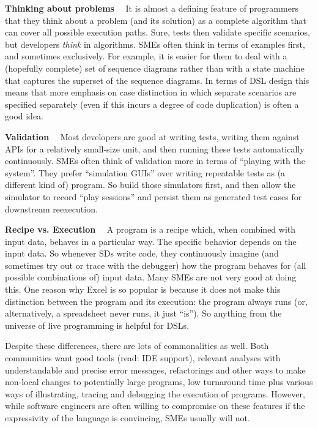 \documentclass[runningheads]{llncs}
\newcommand\parhead[1]{\vspace{1mm}\noindent\textbf{{#1}}\ \ }
\begin{document}
\parhead{Thinking about problems} It is almost a defining feature of programmers
that they think about a problem (and its solution) as a complete algorithm that
can cover all possible execution paths. Sure, tests then validate specific
scenarios, but developers \emph{think} in algorithms. SMEs often think in terms
of examples first, and sometimes exclusively. For example, it is easier for them
to deal with a (hopefully complete) set of sequence diagrams rather than with a
state machine that captures the superset of the sequence diagrams. In terms of
DSL design this means that more emphasis on case distinction in which
separate scenarios are specified separately (even if this incurs a degree of code
duplication) is often a good idea.

\parhead{Validation} Most developers are good at writing tests, writing
them against APIs for a relatively small-size unit, and then running these
tests automatically continuously. SMEs often think of validation more in
terms of ``playing with the system''. They prefer ``simulation GUIs'' over
writing repeatable tests as (a different kind of) program. So build those
simulators first, and then allow the simulator to record ``play sessions''
and persist them as generated test cases for downstream reexecution.

\parhead{Recipe vs. Execution} A program is a recipe which, when combined with
input data, behaves in a particular way. The specific behavior depends on the
input data. So whenever SDs write code, they continuously imagine (and sometimes
try out or trace with the debugger) how the program behaves for (all possible
combinations of) input data. Many SMEs are not very good at doing this. One
reason why Excel is so popular is because it does not make this distinction
between the program and its execution: the program always runs (or,
alternatively, a spreadsheet never runs, it just ``is''). So anything from the
universe of live programming is helpful for DSLs.

\vspace{3mm}
\noindent Despite these differences, there are lots of commonalities as well.
Both communities want good tools (read: IDE support), relevant analyses with
understandable and precise error messages, refactorings and other ways to make
non-local changes to potentially large programs, low turnaround time plus
various ways of illustrating, tracing and debugging the execution of programs.  
However, while software engineers are often willing to compromise on these
features if the expressivity of the language is convincing, SMEs usually will 
not.
\end{document}
